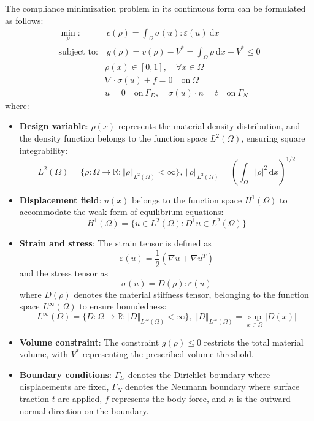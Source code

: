 \documentclass[mathpazo]{cicp}
\begin{document}
The compliance minimization problem in its continuous form can be formulated as follows:
\begin{equation}\label{eq:cmpc}
\begin{aligned}
	\min_{\rho}:&~c(\rho) = \int_{\Omega}\sigma(u):\varepsilon(u)~\mathrm{d}x  \\
	\text{subject~to}:&~g(\rho) = v(\rho) - V^* = \int_\Omega\rho~\mathrm{d}x - V^*\leq0\\
	&\rho(x)\in[0,1],\quad\forall{x}\in\Omega\\
	&\nabla\cdot\sigma(u)+f=0\quad\mathrm{on}~\Omega\\
	&u=0\quad\mathrm{on}~\Gamma_D,\quad\sigma(u)\cdot{n}=t\quad\mathrm{on}~\Gamma_N
\end{aligned}
\end{equation}
where:
\begin{itemize} 
	\item \textbf{Design variable}: $\rho(x)$ represents the material density distribution, and the density function belongs to the function space $L^2(\Omega)$, ensuring square integrability:
	\begin{equation*}
		L^2(\Omega)=\{\rho:\Omega\to\mathbb{R}:\Vert \rho\Vert_{L^2(\Omega)}<\infty\},~\Vert \rho\Vert_{L^2(\Omega)}=\left(\int_\Omega|\rho|^2\,\mathrm{d}x\right)^{1/2}
	\end{equation*}
	\item \textbf{Displacement field}: $u(x)$ belongs to the function space $H^1(\Omega)$ to accommodate the weak form of equilibrium equations:
	\begin{equation*}
		H^1(\Omega)=\{u\in L^2(\Omega):D^1u\in L^2(\Omega)\}
	\end{equation*}
	\item \textbf{Strain and stress}: The strain tensor is defined as
	\begin{equation*}
		\varepsilon(u) = \frac{1}{2}(\nabla{u}+\nabla{u}^T)
	\end{equation*}
	and the stress tensor as
	\begin{equation*}
		\sigma(u) = D(\rho):\varepsilon(u)
	\end{equation*}
	where $D(\rho)$ denotes the material stiffness tensor, belonging to the function space $L^\infty(\Omega)$ to ensure boundedness:
	\begin{equation*}
		L^\infty(\Omega)=\{D:\Omega\to\mathbb{R}:\Vert D\Vert_{L^\infty(\Omega)}<\infty\},~\Vert D\Vert_{L^\infty(\Omega)}=\sup_{x\in\Omega}|D(x)|
	\end{equation*}
	\item \textbf{Volume constraint}: The constraint $g(\rho)\leq0$ restricts the total material volume, with $V^*$ representing the prescribed volume threshold.
	\item \textbf{Boundary conditions}: $\Gamma_D$ denotes the Dirichlet boundary where displacements are fixed, $\Gamma_N$ denotes the Neumann boundary where surface traction $t$ are applied, $f$ represents the body force, and $n$ is the outward normal direction on the boundary.
\end{itemize}
\end{document}
